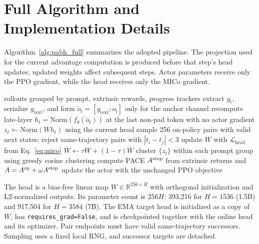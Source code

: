 
\section{Full Algorithm and Implementation Details}
\label{app:algorithm}

Algorithm~\ref{alg:pabh_full} summarizes the adopted pipeline. The projection used for the current advantage computation is produced before that step's head updates; updated weights affect subsequent steps. Actor parameters receive only the PPO gradient, while the head receives only the MICo gradient.

\begin{algorithm}[h]
\caption{PABH advantage computation and head update}
\label{alg:pabh_full}
\begin{algorithmic}[1]
\Require rollouts grouped by prompt, extrinsic rewards, progress trackers
  \State extract $g_t$, serialize $g_{\mathrm{text}}$, and form $\tilde o_t=[g_{\mathrm{text}};o_t]$ only for the anchor channel
  \State recompute late-layer $h_t=\mathrm{Norm}(f_\theta(\tilde o_t))$ at the last non-pad token with no actor gradient
  \State $z_t\leftarrow\mathrm{Norm}(Wh_t)$ using the current head
    \State sample 256 on-policy pairs with valid next states; reject same-trajectory pairs with $|t_i-t_j|<3$
      \State update $W$ with $\mathcal L_{\mathrm{head}}$ from Eq.~\ref{eq:mico}
      \State $\bar W\leftarrow\tau W+(1-\tau)\bar W$ 
    \EndFor
  \EndFor
  \State cluster $\{z_t\}$ within each prompt group using greedy cosine clustering
  \State compute PACE $A^{\mathrm{step}}$ from extrinsic returns and $A=A^{\mathrm{ep}}+\omega A^{\mathrm{step}}$
  \State update the actor with the unchanged PPO objective
\EndFor
\end{algorithmic}
\end{algorithm}

The head is a bias-free linear map $W\in\mathbb R^{256\times H}$ with orthogonal initialization and L2-normalized outputs. Its parameter count is $256H$: 393,216 for $H=1536$ (1.5B) and 917,504 for $H=3584$ (7B). The EMA target head is initialized as a copy of $W$, has \texttt{requires\_grad=False}, and is checkpointed together with the online head and its optimizer. Pair endpoints must have valid same-trajectory successors. Sampling uses a fixed local RNG, and successor targets are detached.

